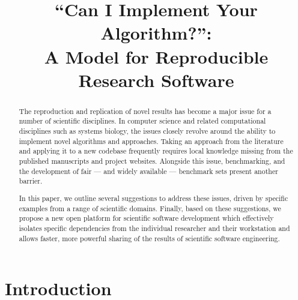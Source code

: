 \documentclass[10pt,conference,final]{IEEEtran}
\begin{document}

\title{``Can I Implement Your Algorithm?'':\\A Model for Reproducible Research Software}

\author{
\and
{}
}

\maketitle

\begin{abstract}
The reproduction and replication of novel results has become a major
issue for a number of scientific disciplines. In computer science and
related computational disciplines such as systems biology, the issues
closely revolve around the ability to implement novel algorithms and
approaches. Taking an approach from the literature and applying it to
a new codebase frequently requires local knowledge missing from the
published manuscripts and project websites. Alongside this issue,
benchmarking, and the development of fair --- and widely available ---
benchmark sets present another barrier.

In this paper, we outline several suggestions to address these issues,
driven by specific examples from a range of scientific domains.
Finally, based on these suggestions, we propose a new open platform
for scientific software development which effectively isolates
specific dependencies from the individual researcher and their
workstation and allows faster, more powerful sharing of the results of
scientific software engineering.
\end{abstract}

\IEEEpeerreviewmaketitle

\section{Introduction}
\end{document}
